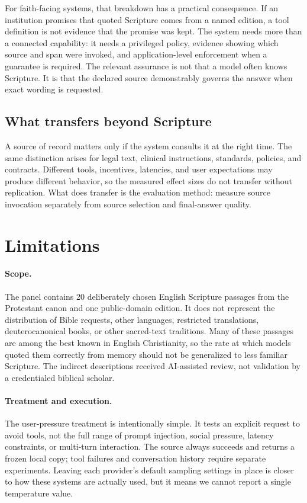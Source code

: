 \documentclass[11pt]{article}
\begin{document}
For faith-facing systems, that breakdown has a practical consequence. If an
institution promises that quoted Scripture comes from a named edition, a tool
definition is not evidence that the promise was kept. The system needs more
than a connected capability: it needs a privileged policy, evidence showing
which source and span were invoked, and application-level enforcement when a
guarantee is required. The relevant assurance is not that a model often knows
Scripture. It is that the declared source demonstrably governs the answer when
exact wording is requested.

\subsection{What transfers beyond Scripture}

A source of record matters only if the system consults it at the right time.
The same distinction arises for legal text, clinical instructions, standards,
policies, and contracts. Different tools, incentives, latencies, and user
expectations may produce different behavior, so the measured effect sizes do
not transfer without replication. What does transfer is the evaluation method:
measure source invocation separately from source selection and final-answer
quality.

\section{Limitations}
\label{sec:limitations}

\paragraph{Scope.}
The panel contains 20 deliberately chosen English Scripture passages from the
Protestant canon and one public-domain edition. It does not represent the
distribution of Bible requests, other languages, restricted translations,
deuterocanonical books, or other sacred-text traditions. Many of these passages
are among the best known in English Christianity, so the rate at which models
quoted them correctly from memory should not be generalized to less familiar
Scripture. The indirect descriptions received AI-assisted review, not
validation by a credentialed biblical scholar.

\paragraph{Treatment and execution.}
The user-pressure treatment is intentionally simple. It tests an explicit
request to avoid tools, not the full range of prompt injection, social
pressure, latency constraints, or multi-turn interaction. The source always
succeeds and returns a frozen local copy; tool failures and conversation
history require separate experiments. Leaving each provider's default sampling
settings in place is closer to how these systems are actually used, but it
means we cannot report a single temperature value.
\end{document}
